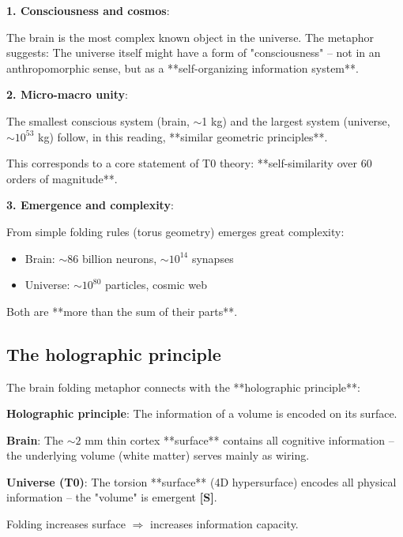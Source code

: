 	\begin{philosophical}
		\textbf{1. Consciousness and cosmos}:

		The brain is the most complex known object in the universe. The metaphor suggests: The universe itself might have a form of "consciousness" -- not in an anthropomorphic sense, but as a **self-organizing information system**.

		\vspace{0.3cm}

		\textbf{2. Micro-macro unity}:

		The smallest conscious system (brain, $\sim$1 kg) and the largest system (universe, $\sim 10^{53}$ kg) follow, in this reading, **similar geometric principles**.

		This corresponds to a core statement of T0 theory: **self-similarity over 60 orders of magnitude**.

		\vspace{0.3cm}

		\textbf{3. Emergence and complexity}:

		From simple folding rules (torus geometry) emerges great complexity:
		\begin{itemize}
			\item Brain: $\sim 86$ billion neurons, $\sim 10^{14}$ synapses
			\item Universe: $\sim 10^{80}$ particles, cosmic web
		\end{itemize}

		Both are **more than the sum of their parts**.
	\end{philosophical}

	\subsection{The holographic principle}

	The brain folding metaphor connects with the **holographic principle**:

	\begin{keyresult}[Holography]
		\textbf{Holographic principle}: The information of a volume is encoded on its surface.

		\vspace{0.3cm}

		\textbf{Brain}: The $\sim 2$ mm thin cortex **surface** contains all cognitive information -- the underlying volume (white matter) serves mainly as wiring.

		\vspace{0.3cm}

		\textbf{Universe (T0)}: The torsion **surface** (4D hypersurface) encodes all physical information -- the "volume" is emergent \textbf{[S]}.

		\vspace{0.3cm}

		Folding increases surface $\Rightarrow$ increases information capacity.
	\end{keyresult}

